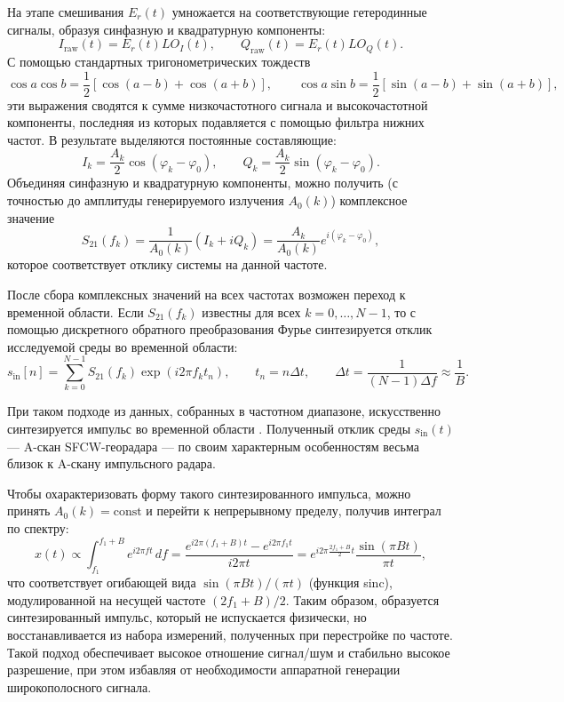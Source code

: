На этапе смешивания $E_r(t)$ умножается на соответствующие гетеродинные сигналы, образуя синфазную и квадратурную компоненты:
\begin{equation}
    I_{\mathrm{raw}}(t) = E_r(t) LO_I(t), \qquad
    Q_{\mathrm{raw}}(t) = E_r(t) LO_Q(t).
\end{equation}
С помощью стандартных тригонометрических тождеств
\begin{equation}
    \cos a \cos b = \frac{1}{2}[\cos(a - b) + \cos(a + b)], \qquad
    \cos a \sin b = \frac{1}{2}[\sin(a - b) + \sin(a + b)],
\end{equation}
эти выражения сводятся к сумме низкочастотного сигнала и высокочастотной компоненты, последняя из которых подавляется с помощью фильтра нижних частот. В результате выделяются постоянные составляющие:
\begin{equation}
    I_k = \frac{A_k}{2} \cos(\varphi_k - \varphi_0), \qquad
    Q_k = \frac{A_k}{2} \sin(\varphi_k - \varphi_0).
\end{equation}
Объединяя синфазную и квадратурную компоненты, можно получить (с точностью до амплитуды генерируемого излучения $A_0(k)$) комплексное значение
\begin{equation}
    S_{21}(f_k) = \frac{1}{A_0(k)} (I_k + i Q_k)
    = \frac{A_k}{A_0(k)} e^{i(\varphi_k - \varphi_0)},
\end{equation}
которое соответствует отклику системы на данной частоте.

После сбора комплексных значений на всех частотах возможен переход к временной области. Если $S_{21}(f_k)$ известны для всех $k = 0, \ldots, N - 1$, то с помощью дискретного обратного преобразования Фурье синтезируется отклик исследуемой среды во временной области:
\begin{equation}
    s_{\mathrm{in}}[n] = \sum_{k=0}^{N-1} S_{21}(f_k) \exp(i 2 \pi f_k t_n),
    \qquad
    t_n = n \Delta t,\qquad
    \Delta t = \frac{1}{(N - 1) \Delta f} \approx \frac{1}{B}.
\end{equation}

При таком подходе из данных, собранных в частотном диапазоне, искусственно синтезируется импульс во временной области \cite{noon1996stepped}. Полученный отклик среды $s_{\mathrm{in}}(t)$ --- A-скан SFCW-георадара --- по своим характерным особенностям весьма близок к A-скану импульсного радара.

Чтобы охарактеризовать форму такого синтезированного импульса, можно принять $A_0(k) = \mathrm{const}$ и перейти к непрерывному пределу, получив интеграл по спектру:
\begin{equation}
    x(t) \propto \int_{f_1}^{f_1+B} e^{i2\pi f t}\,df
    = \frac{e^{i2\pi(f_1+B)t} - e^{i2\pi f_1t}}{i2\pi t}
    = e^{i2\pi \frac{2f_1+B}{2}t}\frac{\sin(\pi Bt)}{\pi t},
\end{equation}
что соответствует огибающей вида $\sin(\pi Bt)/(\pi t)$ (функция sinc), модулированной на несущей частоте $(2f_1 + B)/2$. Таким образом, образуется синтезированный импульс, который не испускается физически, но восстанавливается из набора измерений, полученных при перестройке по частоте. Такой подход обеспечивает высокое отношение сигнал/шум и стабильно высокое разрешение, при этом избавляя от необходимости аппаратной генерации широкополосного сигнала.

